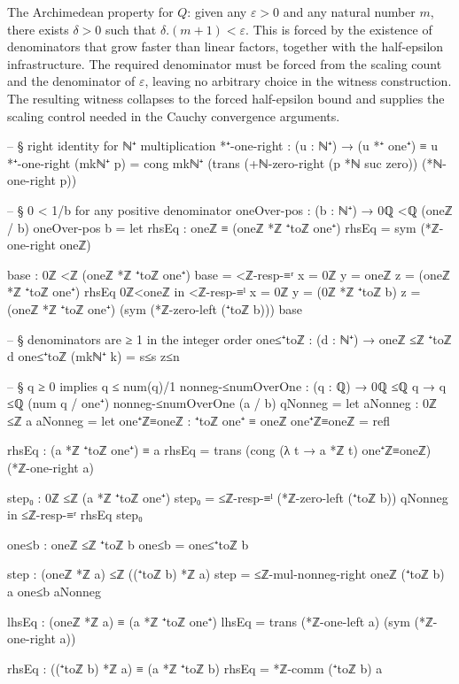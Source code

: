 \documentclass[11pt,a4paper]{book}
\def\cdot{.}%
\def\mathbb#1{#1}%
\begin{document}
The Archimedean property for $\mathbb{Q}$: given any $\varepsilon > 0$
and any natural number $m$, there exists $\delta > 0$ such that
$\delta \cdot (m+1) < \varepsilon$. This is forced by the existence of
denominators that grow faster than linear factors, together with the
half-epsilon infrastructure.  The required denominator must be forced from the
scaling count and the denominator of $\varepsilon$, leaving no arbitrary choice
in the witness construction.
The resulting witness collapses to the forced half-epsilon bound and supplies
the scaling control needed in the Cauchy convergence arguments.

\begin{code}
-- § right identity for ℕ⁺ multiplication
*⁺-one-right : (u : ℕ⁺) → (u *⁺ one⁺) ≡ u
*⁺-one-right (mkℕ⁺ p) =
  cong mkℕ⁺
    (trans
      (+ℕ-zero-right (p *ℕ suc zero))
      (*ℕ-one-right p))

-- § 0 < 1/b for any positive denominator
oneOver-pos : (b : ℕ⁺) → 0ℚ <ℚ (oneℤ / b)
oneOver-pos b =
  let
    rhsEq : oneℤ ≡ (oneℤ *ℤ ⁺toℤ one⁺)
    rhsEq = sym (*ℤ-one-right oneℤ)

    base : 0ℤ <ℤ (oneℤ *ℤ ⁺toℤ one⁺)
    base = <ℤ-resp-≡ʳ {x = 0ℤ} {y = oneℤ} {z = (oneℤ *ℤ ⁺toℤ one⁺)} rhsEq 0ℤ<oneℤ
  in
  <ℤ-resp-≡ˡ
    {x = 0ℤ}
    {y = (0ℤ *ℤ ⁺toℤ b)}
    {z = (oneℤ *ℤ ⁺toℤ one⁺)}
    (sym (*ℤ-zero-left (⁺toℤ b)))
    base

-- § denominators are ≥ 1 in the integer order
one≤⁺toℤ : (d : ℕ⁺) → oneℤ ≤ℤ ⁺toℤ d
one≤⁺toℤ (mkℕ⁺ k) = s≤s z≤n

-- § q ≥ 0 implies q ≤ num(q)/1
nonneg-≤numOverOne : (q : ℚ) → 0ℚ ≤ℚ q → q ≤ℚ (num q / one⁺)
nonneg-≤numOverOne (a / b) qNonneg =
  let
    aNonneg : 0ℤ ≤ℤ a
    aNonneg =
      let
        one⁺ℤ≡oneℤ : ⁺toℤ one⁺ ≡ oneℤ
        one⁺ℤ≡oneℤ = refl

        rhsEq : (a *ℤ ⁺toℤ one⁺) ≡ a
        rhsEq = trans (cong (λ t → a *ℤ t) one⁺ℤ≡oneℤ) (*ℤ-one-right a)

        step₀ : 0ℤ ≤ℤ (a *ℤ ⁺toℤ one⁺)
        step₀ = ≤ℤ-resp-≡ˡ (*ℤ-zero-left (⁺toℤ b)) qNonneg
      in
      ≤ℤ-resp-≡ʳ rhsEq step₀

    one≤b : oneℤ ≤ℤ ⁺toℤ b
    one≤b = one≤⁺toℤ b

    step : (oneℤ *ℤ a) ≤ℤ ((⁺toℤ b) *ℤ a)
    step = ≤ℤ-mul-nonneg-right oneℤ (⁺toℤ b) a one≤b aNonneg

    lhsEq : (oneℤ *ℤ a) ≡ (a *ℤ ⁺toℤ one⁺)
    lhsEq = trans (*ℤ-one-left a) (sym (*ℤ-one-right a))

    rhsEq : ((⁺toℤ b) *ℤ a) ≡ (a *ℤ ⁺toℤ b)
    rhsEq = *ℤ-comm (⁺toℤ b) a


\end{code}
\end{document}
